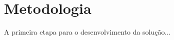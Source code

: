 \chapter{Metodologia} \label{cap:metodologia}
A primeira etapa para o desenvolvimento da solução...
